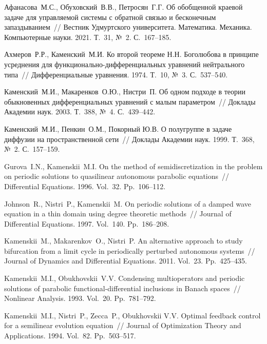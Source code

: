  

\begin{thebibliography}{9} %

 Афанасова~М.С., Обуховский~В.В., Петросян~Г.Г. Об обобщенной краевой задаче для управляемой системы с обратной связью и бесконечным запаздыванием~// Вестник Удмуртского университета. Математика. Механика. Компьютерные науки. 2021. Т.~31, №~2. С.~167--185.

 Ахмеров~Р.Р., Каменский~М.И.  Ко второй теореме Н.Н. Боголюбова в принципе усреднения для функционально-дифференциальных уравнений нейтрального типа~// Дифференциальные уравнения. 1974. Т.~10, №~3. С.~537--540.

 Каменский~М.И., Макаренков~О.Ю., Нистри~П. Об одном подходе в теории обыкновенных дифференциальных уравнений с малым параметром~// Доклады Академии наук. 2003. Т.~388, №~4. С.~439--442.

 Каменский~М.И., Пенкин~О.М., Покорный Ю.В. О полугруппе в задаче диффузии на пространственной сети~// Доклады Академии наук. 1999. Т.~368, №~2. С.~157--159.


 Gurova~I.N., Kamenskii~M.I. On the method of semidiscre\-ti\-za\-tion in the problem on periodic solutions to quasilinear autonomous parabolic equations~// Differential Equations. 1996. Vol.~32. Pp.~106--112.


 Johnson~R., Nistri~P., Kamenskii~M. On periodic solutions of a damped wave equation in a thin domain using degree theoretic methods~// Journal of Diffe\-ren\-tial Equations. 1997. Vol.~140. Pp.~186--208.

 Kamenskii~M., Makarenkov~O., Nistri~P. An alternative approa\-ch to study bifurcation from a limit cycle in periodically perturbed autonomous systems~// Journal of Dynamics and Diffe\-ren\-tial Equations. 2011. Vol.~23. Pp.~425--435.


 Kamenskii~M.I., Obukhovskii~V.V. Condensing multi\-ope\-ra\-tors and periodic solutions of parabolic functional-differe\-ntial inc\-lu\-sions in Banach spaces~// Nonlinear Analysis. 1993. Vol.~20. Pp.~781--792.

 Kamenskii~M.I., Nistri~P., Zecca~P., Obukhovskii V.V. Optimal feedback control for a semilinear evolution equation~// Journal of Optimi\-za\-tion Theory and Applications. 1994. Vol.~82. Pp.~503--517.


\end{thebibliography}




%

